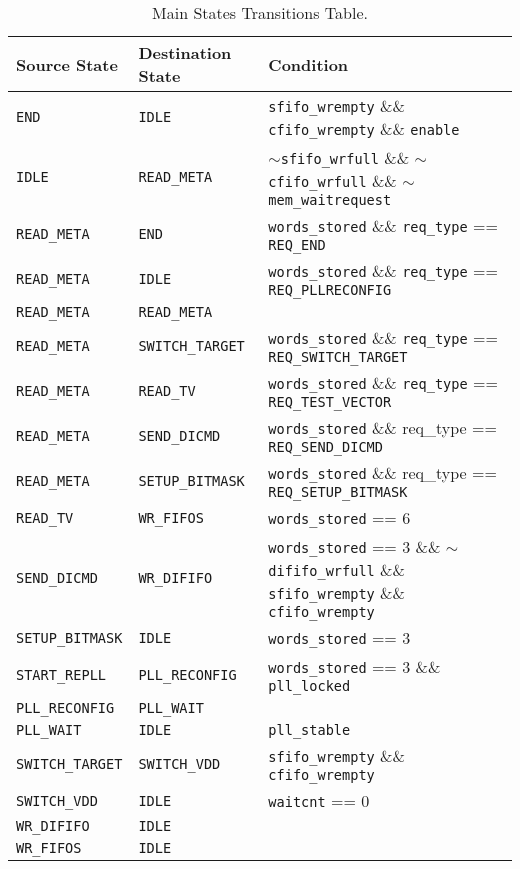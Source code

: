 \begin{table}[ht]
\centering
\begin{tabular}{|l|l|p{}|}
\hline
Source State & Destination State & Condition \\
\hline
\texttt{END} & \texttt{IDLE} & \texttt{sfifo\_wrempty} \&\& \texttt{cfifo\_wrempty} \&\& \texttt{enable} \\
\hline
\texttt{IDLE} & \texttt{READ\_META} & \texttt{$\sim$sfifo\_wrfull} \&\& \texttt{$\sim$cfifo\_wrfull} \&\& \texttt{$\sim$mem\_waitrequest} \\
\hline
\texttt{READ\_META} & \texttt{END} & \texttt{words\_stored} \&\& \texttt{req\_type} == \texttt{REQ\_END} \\
\hline
\texttt{READ\_META} & \texttt{IDLE} & \texttt{words\_stored} \&\& \texttt{req\_type} == \texttt{REQ\_PLLRECONFIG} \\
\hline
\texttt{READ\_META} & \texttt{READ\_META} &  \\
\hline
\texttt{READ\_META} & \texttt{SWITCH\_TARGET} & \texttt{words\_stored} \&\& \texttt{req\_type} == \texttt{REQ\_SWITCH\_TARGET} \\
\hline
\texttt{READ\_META} & \texttt{READ\_TV} & \texttt{words\_stored} \&\& \texttt{req\_type} == \texttt{REQ\_TEST\_VECTOR} \\
\hline
\texttt{READ\_META} & \texttt{SEND\_DICMD} & \texttt{words\_stored} \&\& req\_type == \texttt{REQ\_SEND\_DICMD} \\
\hline
\texttt{READ\_META} & \texttt{SETUP\_BITMASK} & \texttt{words\_stored} \&\& req\_type == \texttt{REQ\_SETUP\_BITMASK} \\
\hline
\texttt{READ\_TV} & \texttt{WR\_FIFOS} & \texttt{words\_stored} == 6 \\
\hline
\texttt{SEND\_DICMD} & \texttt{WR\_DIFIFO} & \texttt{words\_stored} == 3 \&\& \texttt{$\sim$dififo\_wrfull} \&\& \texttt{sfifo\_wrempty} \&\& \texttt{cfifo\_wrempty} \\
\hline
\texttt{SETUP\_BITMASK} & \texttt{IDLE} & \texttt{words\_stored} == 3 \\
\hline
\texttt{START\_REPLL} & \texttt{PLL\_RECONFIG} & \texttt{words\_stored} == 3 \&\& \texttt{pll\_locked} \\
\hline
\texttt{PLL\_RECONFIG} & \texttt{PLL\_WAIT} &  \\
\hline
\texttt{PLL\_WAIT} & \texttt{IDLE} & \texttt{pll\_stable} \\
\hline
\texttt{SWITCH\_TARGET} & \texttt{SWITCH\_VDD} & \texttt{sfifo\_wrempty} \&\& \texttt{cfifo\_wrempty} \\
\hline
\texttt{SWITCH\_VDD} & \texttt{IDLE} & \texttt{waitcnt} == 0 \\
\hline
\texttt{WR\_DIFIFO} & \texttt{IDLE} &  \\
\hline
\texttt{WR\_FIFOS} & \texttt{IDLE} &  \\
\hline
\end{tabular}
\caption{Main States Transitions Table.}
\label{tab:states_transitions}
\end{table}







